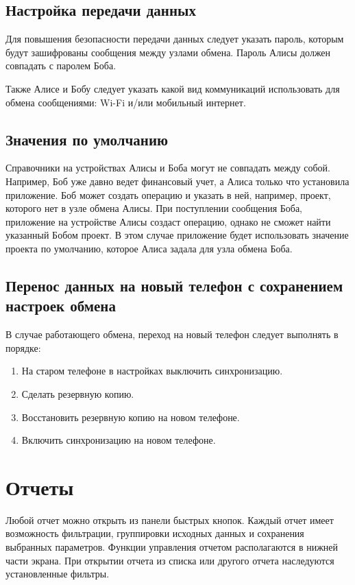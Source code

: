 \documentclass[a4paper,10pt,russian]{sphinxmanual}
\begin{document}
\section{Настройка передачи данных}
\label{\detokenize{teamwork:id9}}
Для повышения безопасности передачи данных следует указать пароль, которым будут зашифрованы сообщения между узлами обмена. Пароль Алисы должен совпадать с паролем Боба.

Также Алисе и Бобу следует указать какой вид коммуникаций использовать для обмена сообщениями: Wi-Fi и/или мобильный интернет.


\section{Значения по умолчанию}
\label{\detokenize{teamwork:id10}}
Справочники на устройствах Алисы и Боба могут не совпадать между собой. Например, Боб уже давно
ведет финансовый учет, а Алиса только что установила приложение. Боб может создать операцию и указать в ней, например,
проект, которого нет в узле обмена Алисы. При поступлении сообщения Боба, приложение на устройстве Алисы
создаст операцию, однако не сможет найти указанный Бобом проект. В этом случае приложение будет использовать
значение проекта по умолчанию, которое Алиса задала для узла обмена Боба.


\section{Перенос данных на новый телефон с сохранением настроек обмена}
\label{\detokenize{teamwork:id11}}
В случае работающего обмена, переход на новый телефон следует выполнять в порядке:
\begin{enumerate}
\def\theenumi{\arabic{enumi}}
\def\labelenumi{\theenumi .}
\makeatletter\def\p@enumii{\p@enumi \theenumi .}\makeatother
\item {} 
На старом телефоне в настройках выключить синхронизацию.

\item {} 
Сделать резервную копию.

\item {} 
Восстановить резервную копию на новом телефоне.

\item {} 
Включить синхронизацию на новом телефоне.

\end{enumerate}


\chapter{Отчеты}
\label{\detokenize{reports:chapter-reports}}\label{\detokenize{reports:id1}}\label{\detokenize{reports::doc}}
Любой отчет можно открыть из панели быстрых кнопок. Каждый отчет имеет возможность фильтрации,
группировки исходных данных и сохранения выбранных параметров. Функции
управления отчетом располагаются в нижней части экрана. При открытии отчета из списка или
другого отчета наследуются установленные фильтры.
\end{document}
